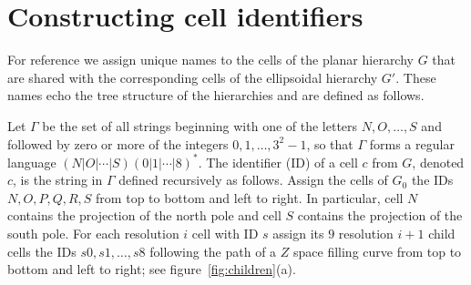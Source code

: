 \documentclass[12pt]{iopart}
\begin{document}
\section{Constructing cell identifiers}\label{sec:cellid}
For reference we assign unique names to the cells of the planar hierarchy $G$ that are shared with the corresponding cells of the ellipsoidal hierarchy $G'$.
These names echo the tree structure of the hierarchies and are defined as follows.

Let $\Gamma$ be the set of all strings beginning with one of the letters $N, O, \ldots, S$ and followed by zero or more of the integers $0, 1, \ldots, 3^2 - 1$, so that $\Gamma$ forms a regular language $(N | O | \cdots | S)(0 | 1 | \cdots | 8)^*$. The identifier (ID) of a cell $c$ from $G$, denoted $c$, is the string in $\Gamma$ defined recursively as follows.
Assign the cells of $G_0$ the IDs $N, O, P, Q, R, S$ from top to bottom and left to right.
In particular, cell $N$ contains the projection of the north pole and cell $S$ contains the projection of the south pole.
For each resolution $i$ cell with ID $s$ assign its $9$ resolution $i + 1$ child cells the IDs $s0, s 1, \ldots, s 8$ following the path of a $Z$ space filling curve from top to bottom and left to right; see figure~\ref{fig:children}(a). 
\end{document}
